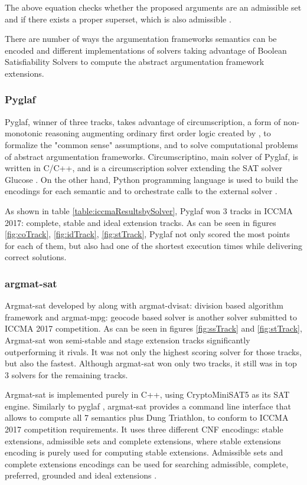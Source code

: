 The above equation checks whether the proposed arguments are an admissible set and if there exists a proper superset, which is also admissible \citep{solvingMethods}.

There are number of ways the argumentation frameworks semantics can be encoded and different implementations of solvers taking advantage of Boolean Satisfiability Solvers to compute the abstract argumentation framework extensions. 

\subsubsection{Pyglaf} \label{section:pyglaf}
Pyglaf, winner of three tracks, takes advantage of circumscription, a form of non-monotonic reasoning augmenting ordinary first order logic created by \citet{circumpscription}, to formalize the "common sense" assumptions, and to solve computational problems of abstract argumentation frameworks.  Circumscriptino, main solver of Pyglaf, is written in C/C++, and is a circumscription solver extending the SAT solver Glucose \citep{glucose}. On the other hand, Python programming language is used to build the encodings for each semantic and to orchestrate calls to the external solver \citep{pyglaf}. 

As shown in table \ref{table:iccmaResultsbySolver}, Pyglaf won 3 tracks in ICCMA 2017: complete, stable and ideal extension tracks. As can be seen in figures \ref{fig:coTrack}, \ref{fig:idTrack}, \ref{fig:stTrack}, Pyglaf not only scored the most points for each of them, but also had one of the shortest execution times while delivering correct solutions.

\subsubsection{argmat-sat}
Argmat-sat developed by \citet{argmatSat} along with argmat-dvisat: division based algorithm framework \citep{argmatDvisat} and argmat-mpg: geocode based solver is another solver submitted to ICCMA 2017 competition. As can be seen in figures \ref{fig:ssTrack} and \ref{fig:stTrack}, Argmat-sat won semi-stable and stage extension tracks significantly outperforming it rivals. It was not only the highest scoring solver for those tracks, but also the fastest. Although argmat-sat won only two tracks, it still was in top 3 solvers for the remaining tracks.

Argmat-sat is implemented purely in C++, using CryptoMiniSAT5 \citep{CryptoMiniSat} as its SAT engine. Similarly to pyglaf \citep{pyglaf}, argmat-sat provides a command line interface that allows to compute all 7 semantics plus Dung Triathlon, to conform to ICCMA 2017 competition requirements. It uses three different CNF encodings: stable extensions, admissible sets and complete extensions, where stable extensions encoding is purely used for computing stable extensions. Admissible sets and complete extensions encodings can be used for searching admissible, complete, preferred, grounded and ideal extensions \citep{argmatSat}. 

